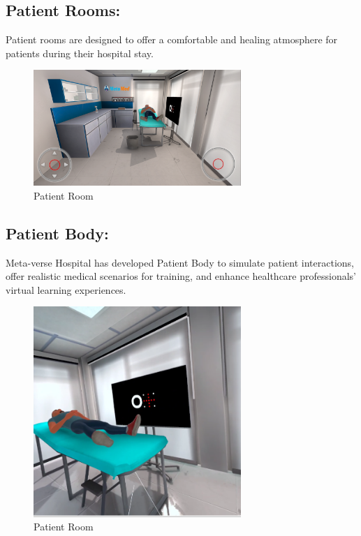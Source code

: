 \subsection{Patient Rooms:}	
Patient rooms are designed to offer a comfortable and healing atmosphere for patients during their hospital stay.
	\begin{figure}[h]
		\centering
		\includegraphics[width=0.7\textwidth, height=0.3\textheight]{Images/Patient Room.png}
		\caption{Patient Room}
		\label{fig:Patient-Room}
	\end{figure}	

\subsection{Patient Body:}	
Meta-verse Hospital has developed Patient Body to simulate patient interactions, offer realistic medical scenarios for training, and enhance healthcare professionals' virtual learning experiences.
\begin{figure}[h]
	\centering
	\includegraphics[width=0.7\textwidth, height=0.3\textheight]{Images/Patient Body.png}
	\caption{Patient Room}
	\label{fig:Patient Room}
\end{figure}	

	